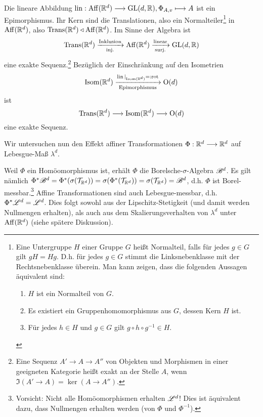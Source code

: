 \begin{remark}
Die lineare Abbildung $\operatorname{lin}:\operatorname{Aff}(\mathbb{R}^d) \overset{\operatorname{}}\longrightarrow \operatorname{GL}(d,\mathbb{R}), \Phi_{A,v} \longmapsto A$ ist ein Epimorphismus. Ihr Kern sind die Translationen, also ein  Normalteiler\footnote{Eine Untergruppe $H$ einer Gruppe $G$ heißt Normalteil, falls für jedes $g \in G$ gilt $gH=Hg$. D.h. für jedes $g\in G$ stimmt die Linksnebenklasse mit der Rechtsnebenklasse überein. Man kann zeigen, dass die folgenden Aussagen äquivalent sind:
\begin{enumerate}[topsep=0pt,itemsep=0pt]
\item $H$ ist ein Normalteil von $G$.
\item Es existiert ein Gruppenhomomorphismus aus $G$, dessen Kern $H$ ist.
\item Für jedes $h\in H$ und $g \in G$ gilt $g\circ h \circ g^{-1} \in H$.
\end{enumerate}\vspace{-0.7pc}} in $\operatorname{Aff}(\mathbb{R}^d)$, also $\operatorname{Trans}(\mathbb{R}^d) \triangleleft \operatorname{Aff}(\mathbb{R}^d)$. Im Sinne der Algebra ist 
$$
\operatorname{Trans} (\mathbb{R}^d) \xrightarrow[\text{inj.}]{\text{Inklusion}} \operatorname{Aff}(\mathbb{R}^d) \xrightarrow[\text{surj.}]{\text{linear}} \operatorname{GL}(d,\mathbb{R})
$$
 eine exakte Sequenz.\footnote{Eine Sequenz $A' \to A \to A''$ von Objekten und Morphismen in einer geeigneten Kategorie heißt exakt an der Stelle $A$, wenn $\Im(A'\to A) = \ker(A \to A'')$.} Bezüglich der Einschränkung auf den Isometrien $$\operatorname{Isom}(\mathbb{R}^d)\xrightarrow[\text{Epimorphismus}]{\operatorname{lin}|_{\operatorname{Isom}(\mathbb{R}^d)}=:\operatorname{rot}} \operatorname{O}(d)$$ ist
$$
\operatorname{Trans}(\mathbb{R}^d) \longrightarrow \operatorname{Isom}(\mathbb{R}^d) \longrightarrow \operatorname{O}(d)
$$
eine exakte Sequenz.
\end{remark}

Wir untersuchen nun den Effekt affiner Transformationen $\Phi:\mathbb{R}^d\longrightarrow \mathbb{R}^d$ auf Lebesgue-Maß $\lambda^d$.\vspace{0.5pc}

Weil $\Phi$ ein Homöomorphismus ist, erhält $\Phi$ die Borelsche-$\sigma$-Algebra $\mathscr{B}^d$. Es gilt nämlich $\Phi^*\mathscr{B}^d= \Phi^*(\sigma(\mathcal{T}_{\mathbb{R}^d})) = \sigma (\Phi^*(\mathcal{T}_{\mathbb{R}^d})) = \sigma (\mathcal{T}_{\mathbb{R}^d})=\mathscr{B}^d$, d.h. $\Phi$ ist Borel-messbar.\footnote{Vorsicht: Nicht alle Homöomorphismen erhalten $\mathscr{L}^d$! Dies ist äquivalent dazu, dass Nullmengen erhalten werden (von $\Phi$ und $\Phi^{-1}$).} Affine Transformationen sind auch Lebesgue-messbar, d.h. $\Phi^* \mathscr{L}^d = \mathscr{L}^d$. Dies folgt sowohl aus der Lipschitz-Stetigkeit (und damit werden Nullmengen erhalten\Ueb), als auch aus dem Skalierungsverhalten von $\lambda^d$ unter $\operatorname{Aff}(\mathbb{R}^d)$ (siehe spätere Diskussion).\vspace{0.5pc}

